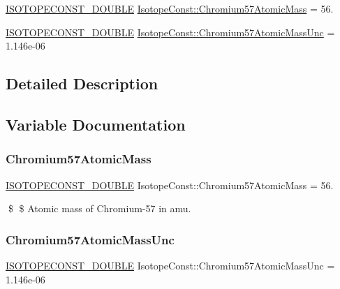 \begin{DoxyCompactItemize}
\item 
\mbox{\hyperlink{group___isotope_const-_macros_ga8f45a7272ce02c0b4c65c44636ed719a}{I\+S\+O\+T\+O\+P\+E\+C\+O\+N\+S\+T\+\_\+\+D\+O\+U\+B\+LE}} \mbox{\hyperlink{group___isotope_const-_chromium-_cr57_gae33c23e0901a7a0484e6f1461fdb4329}{Isotope\+Const\+::\+Chromium57\+Atomic\+Mass}} = 56.
\item 
\mbox{\hyperlink{group___isotope_const-_macros_ga8f45a7272ce02c0b4c65c44636ed719a}{I\+S\+O\+T\+O\+P\+E\+C\+O\+N\+S\+T\+\_\+\+D\+O\+U\+B\+LE}} \mbox{\hyperlink{group___isotope_const-_chromium-_cr57_ga4bb7262c8d6db21b9325d132b11adb2d}{Isotope\+Const\+::\+Chromium57\+Atomic\+Mass\+Unc}} = 1.\+146e-\/06
\end{DoxyCompactItemize}


\subsection{Detailed Description}


\subsection{Variable Documentation}
\mbox{\label{group___isotope_const-_chromium-_cr57_gae33c23e0901a7a0484e6f1461fdb4329}} 
\subsubsection{\texorpdfstring{Chromium57\+Atomic\+Mass}{Chromium57AtomicMass}}
{\footnotesize\ttfamily \mbox{\hyperlink{group___isotope_const-_macros_ga8f45a7272ce02c0b4c65c44636ed719a}{I\+S\+O\+T\+O\+P\+E\+C\+O\+N\+S\+T\+\_\+\+D\+O\+U\+B\+LE}} Isotope\+Const\+::\+Chromium57\+Atomic\+Mass = 56.}

\$ \$ Atomic mass of Chromium-\/57 in amu. \mbox{\label{group___isotope_const-_chromium-_cr57_ga4bb7262c8d6db21b9325d132b11adb2d}} 
\subsubsection{\texorpdfstring{Chromium57\+Atomic\+Mass\+Unc}{Chromium57AtomicMassUnc}}
{\footnotesize\ttfamily \mbox{\hyperlink{group___isotope_const-_macros_ga8f45a7272ce02c0b4c65c44636ed719a}{I\+S\+O\+T\+O\+P\+E\+C\+O\+N\+S\+T\+\_\+\+D\+O\+U\+B\+LE}} Isotope\+Const\+::\+Chromium57\+Atomic\+Mass\+Unc = 1.\+146e-\/06}

